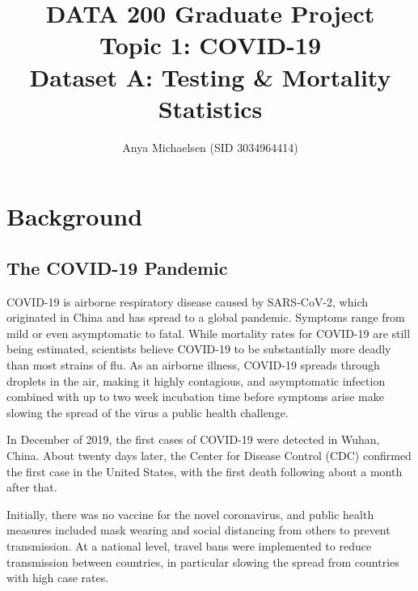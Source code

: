 \documentclass[11pt]{article}
\title{DATA 200 Graduate Project\\ {\Large Topic 1: COVID-19}\\
{\large Dataset A: Testing \& Mortality Statistics}}
\author{ Anya Michaelsen (SID 3034964414) }
\date{}
\begin{document}
\maketitle	

{ \hypersetup{hidelinks} \tableofcontents }%


%
%
%
%
%

\pagebreak
\section{Background}


\subsection{The COVID-19 Pandemic}

COVID-19 is airborne respiratory disease caused by SARS-CoV-2, which originated in China and has spread to a global pandemic. Symptoms range from mild or even asymptomatic to fatal. While mortality rates for COVID-19 are still being estimated, scientists believe COVID-19 to be substantially more deadly than most strains of flu.%
 As an airborne illness, COVID-19 spreads through droplets in the air, making it highly contagious, and asymptomatic infection combined with up to two week incubation time before symptoms arise make slowing the spread of the virus a public health challenge. 
 
 In December of 2019, the first cases of COVID-19 were detected in Wuhan, China. About twenty days later, the Center for Disease Control (CDC) confirmed the first case in the United States, with the first death following about a month after that. 
 
 Initially, there was no vaccine for the novel coronavirus, and public health measures included mask wearing and social distancing from others to prevent transmission. At a national level, travel bans were implemented to reduce transmission between countries, in particular slowing the spread from countries with high case rates. 
 
\end{document}
